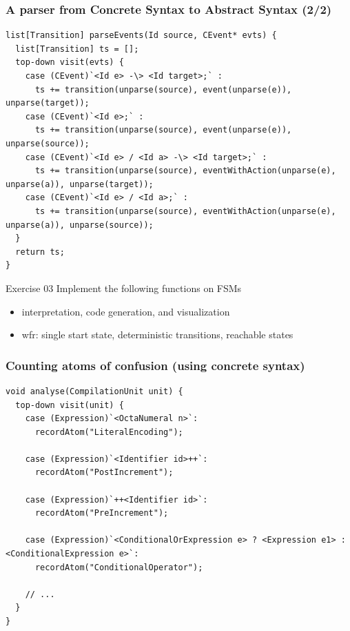 \documentclass{beamer}
\begin{document}
\begin{frame}[fragile]
\frametitle{A parser from Concrete Syntax to Abstract Syntax (2/2)}

\begin{lstlisting}[language=Rascal]
list[Transition] parseEvents(Id source, CEvent* evts) {
  list[Transition] ts = [];
  top-down visit(evts) {
    case (CEvent)`<Id e> -\> <Id target>;` : 
      ts += transition(unparse(source), event(unparse(e)), unparse(target));
    case (CEvent)`<Id e>;` : 
      ts += transition(unparse(source), event(unparse(e)), unparse(source));
    case (CEvent)`<Id e> / <Id a> -\> <Id target>;` : 
      ts += transition(unparse(source), eventWithAction(unparse(e), unparse(a)), unparse(target));
    case (CEvent)`<Id e> / <Id a>;` : 
      ts += transition(unparse(source), eventWithAction(unparse(e), unparse(a)), unparse(source));
  }
  return ts;
}
\end{lstlisting}

\end{frame}

\begin{frame}

  \begin{block}{Exercise 03}
    Implement the following functions on FSMs
    \begin{itemize}
      \item interpretation, code generation, and visualization
      \item wfr: single start state, deterministic transitions, reachable states
    \end{itemize}
  \end{block}
\end{frame}


\begin{frame}[fragile]
  \frametitle{Counting atoms of confusion (using concrete syntax)}

  \begin{lstlisting}[language=Rascal]
void analyse(CompilationUnit unit) {
  top-down visit(unit) {
    case (Expression)`<OctaNumeral n>`:
      recordAtom("LiteralEncoding"); 

    case (Expression)`<Identifier id>++`:
      recordAtom("PostIncrement");

    case (Expression)`++<Identifier id>`:
      recordAtom("PreIncrement"); 

    case (Expression)`<ConditionalOrExpression e> ? <Expression e1> : <ConditionalExpression e>`:
      recordAtom("ConditionalOperator");

    // ... 
  }
}
  \end{lstlisting}  
\end{frame}
\end{document}
